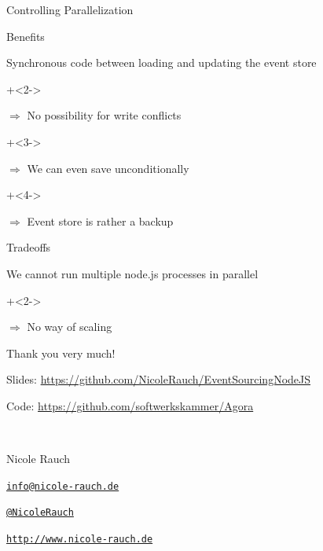 \begin{frame}[fragile]{Controlling Parallelization}
\begin{center}
\end{center}

\end{frame}


\begin{frame}[fragile]{Benefits}

Synchronous code between loading and updating the event store

\onslide+<2->
\vspace{2em}

$\Longrightarrow$ No possibility for write conflicts

\onslide+<3->
\vspace{2em}

$\Longrightarrow$ We can even save unconditionally

\onslide+<4->
\vspace{2em}

$\Longrightarrow$ Event store is rather a backup

\end{frame}

\begin{frame}[fragile]{Tradeoffs}

We cannot run multiple node.js processes in parallel

\onslide+<2->
\vspace{2em}

$\Longrightarrow$ No way of scaling

\end{frame}


\begin{frame}{Thank you very much!}

        Slides: \url{https://github.com/NicoleRauch/EventSourcingNodeJS} 
        \vspace{1em}

        Code: \url{https://github.com/softwerkskammer/Agora}
        
        ~\\[1em]
        \begin{block}{Nicole Rauch}
        \begin{description}[Twitterxx]
                \item[E-Mail]  \href{mailto:info@nicole-rauch.de}{\texttt{info@nicole-rauch.de}}
                \item[Twitter] \href{http://twitter.com/NicoleRauch}{\texttt{@NicoleRauch}}
                \item[Web] \href{http://www.nicole-rauch.de}{\texttt{http://www.nicole-rauch.de}}
        \end{description}
        \end{block}
\end{frame}

